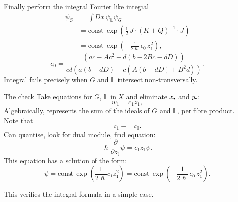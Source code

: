     \begin{frame}{Finally perform the integral}
    Fourier like integral 
         \begin{align*} 
         \psi_{\mathcal{B}} &= \int Dx \, \psi_{\mathbb{L}} \psi_{G}  \\
         &= \text{const} \, \exp \left( \frac12\, J\cdot (K+Q)^{-1} \cdot J \right) \\
         & = \text{const}\, \exp\left( -\frac{1}{2 \hslash}\, c_0\, z_1^2\right),
    \end{align*}
    \[ c_0 = \frac{\left(a c-A c^2+d (b-2 B c-d D)\right)}{ c d  \left(a (b-d D)-c \left(A (b-d D)+B^2 d\right)\right)}.\]
    Integral fails precisely when \(G\) and \( \mathbb{L}\) intersect non-transversally.
    \end{frame}
    
    \begin{frame}{The check}
    Take equations for \(G\), \(\mathbb{L}\) in \(X\) and eliminate \(x_{\sbt}\) and \( y_{\sbt}\):
    \begin{equation}
        \label{eqn:check1}
        w_1 = c_1 z_1,
    \end{equation}
    Algebraically, represents the sum of the ideals of \(G\) and \( \mathbb{L}\), per fibre product. Note that \[c_1 = -c_0.\]  
    Can quantise, look for dual module, find equation:
    \[ \hslash \frac{\partial}{\partial z_1} \psi = c_1 z_1 \psi. \]
    This equation has a solution of the form:
    \[ \psi =  \mathrm{const} \, \exp\left( \frac{1}{2 \hslash} c_1 z_1^2 \right) = \text{const}\, \exp\left( -\frac{1}{2 \hslash}\, c_0\, z_1^2\right).\]
    
    \end{frame}
    
    \begin{frame}
        This verifies the integral formula in a simple case. 
    \end{frame}